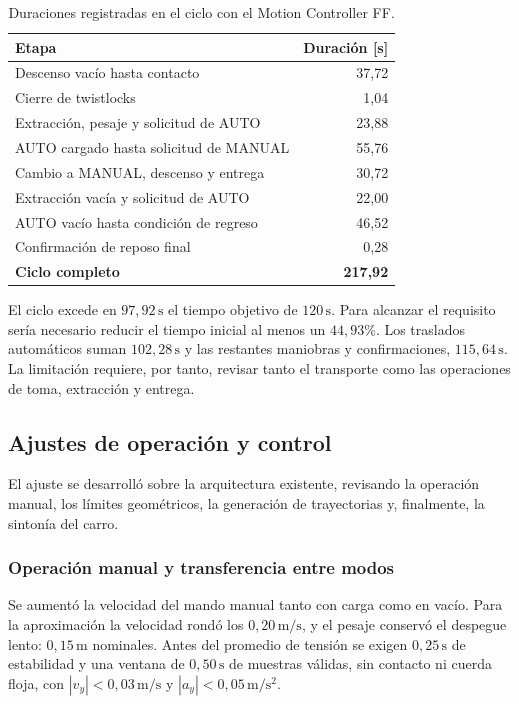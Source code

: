 \documentclass[a4paper,10pt,onecolumn,journal]{ieeeconf}
\numberwithin{equation}{section}
\newcommand{\un}[1]{\,\mathrm{#1}}
\begin{document}
\begin{table}[H]\centering\small
\caption{Duraciones registradas en el ciclo con el Motion Controller FF.}
\label{tab:productividad_inicial}
\begin{tabularx}{\linewidth}{@{}Yr@{}}\toprule
Etapa & Duración [s]\\\midrule
Descenso vacío hasta contacto & 37,72\\
Cierre de twistlocks & 1,04\\
Extracción, pesaje y solicitud de AUTO & 23,88\\
AUTO cargado hasta solicitud de MANUAL & 55,76\\
Cambio a MANUAL, descenso y entrega & 30,72\\
Extracción vacía y solicitud de AUTO & 22,00\\
AUTO vacío hasta condición de regreso & 46,52\\
Confirmación de reposo final & 0,28\\\midrule
\textbf{Ciclo completo} & \textbf{217,92}\\\bottomrule
\end{tabularx}
\end{table}

El ciclo excede en $97{,}92\un{s}$ el tiempo objetivo de $120\un{s}$. Para alcanzar el requisito sería necesario reducir el tiempo inicial
al menos un $44{,}93\%$. Los traslados automáticos suman
$102{,}28\un{s}$ y las restantes maniobras y confirmaciones,
$115{,}64\un{s}$. La limitación requiere, por tanto, revisar tanto
el transporte como las operaciones de toma, extracción y entrega.

\subsection{Ajustes de operación y control}

El ajuste se desarrolló sobre la arquitectura existente, revisando
la operación manual, los límites geométricos, la generación de
trayectorias y, finalmente, la sintonía del carro.

\subsubsection{Operación manual y transferencia entre modos}

Se aumentó la velocidad del mando manual tanto con carga como en vacío. Para la aproximación la velocidad rondó los $0{,}20\un{m/s}$, y el pesaje conservó el despegue lento: $0{,}15\un{m}$ nominales. Antes del promedio de tensión se exigen $0{,}25\un{s}$ de estabilidad y una ventana de $0{,}50\un{s}$ de muestras válidas, sin contacto ni cuerda
floja, con $|v_y|<0{,}03\un{m/s}$ y $|a_y|<0{,}05\un{m/s^2}$.
\end{document}
